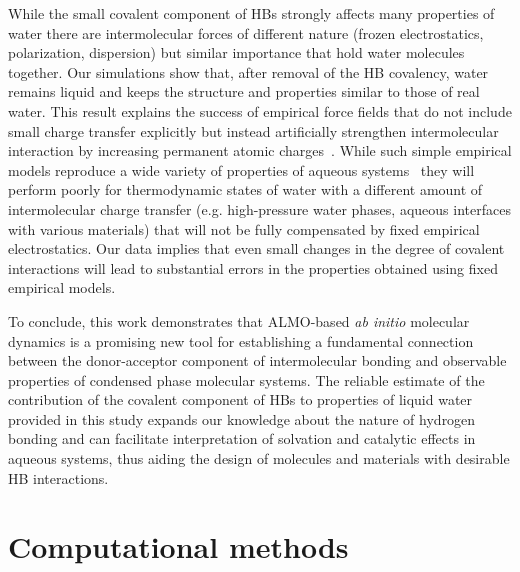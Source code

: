 \documentclass[aps,prl,reprint,amsmath,amssymb]{revtex4-1}
\begin{document}
While the small covalent component of HBs strongly affects many properties of water there are intermolecular forces of different nature (frozen electrostatics, polarization, dispersion) but similar importance that hold water molecules together. 
Our simulations show that, after removal of the HB covalency, water remains liquid and keeps the structure and properties similar to those of real water. 
This result explains the success of empirical force fields that do not include small charge transfer explicitly but instead artificially strengthen intermolecular interaction by increasing permanent atomic charges~\cite{rick2016polarizable}. 
While such simple empirical models reproduce a wide variety of properties of aqueous systems~\cite{vega2011simulating} they will perform poorly for thermodynamic states of water with a different amount of intermolecular charge transfer (e.g. high-pressure water phases, aqueous interfaces with various materials) that will not be fully compensated by fixed empirical electrostatics.
Our data implies that even small changes in the degree of covalent interactions will lead to substantial errors in the properties obtained using fixed empirical models.

To conclude, this work demonstrates that ALMO-based \emph{ab initio} molecular dynamics is a promising new tool for establishing a fundamental connection between the donor-acceptor component of intermolecular bonding and observable properties of condensed phase molecular systems. 
The reliable estimate of the contribution of the covalent component of HBs to properties of liquid water provided in this study expands our knowledge about the nature of hydrogen bonding and can facilitate interpretation of solvation and catalytic effects in aqueous systems, thus aiding the design of molecules and materials with desirable HB interactions. 
 
\section{Computational methods}
\end{document}
